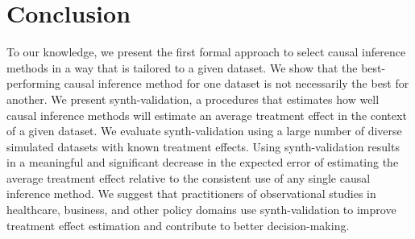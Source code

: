 \section{Conclusion}


To our knowledge, we present the first formal approach to select causal inference methods in a way that is tailored to a given dataset. We show that the best-performing causal inference method for one dataset is not necessarily the best for another. We present synth-validation, a procedures that estimates how well causal inference methods will estimate an average treatment effect in the context of a given dataset. We evaluate synth-validation using a large number of diverse simulated datasets with known treatment effects. Using synth-validation results in a meaningful and significant decrease in the expected error of estimating the average treatment effect relative to the consistent use of any single causal inference method. We suggest that practitioners of observational studies in healthcare, business, and other policy domains use synth-validation to improve treatment effect estimation and contribute to better decision-making.

